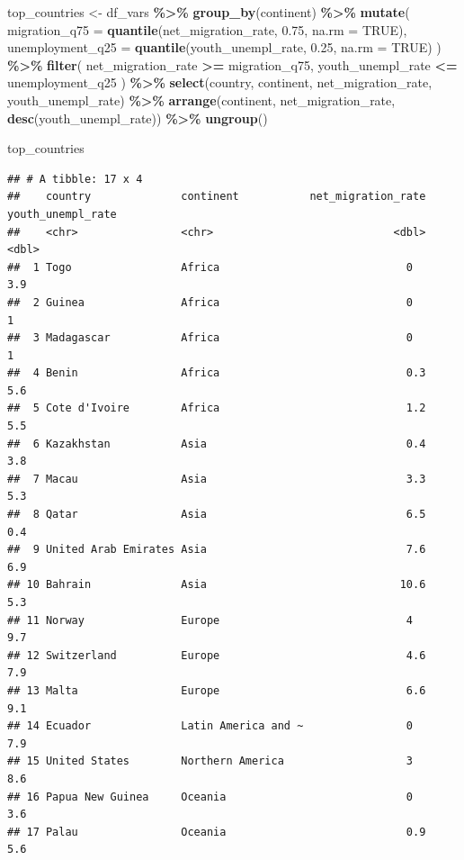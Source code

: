\documentclass[
]{article}
\newenvironment{Shaded}{\begin{snugshade}}{\end{snugshade}}
\newcommand{\AttributeTok}[1]{\textcolor[rgb]{0.13,0.29,0.53}{#1}}
\newcommand{\ConstantTok}[1]{\textcolor[rgb]{0.56,0.35,0.01}{#1}}
\newcommand{\FloatTok}[1]{\textcolor[rgb]{0.00,0.00,0.81}{#1}}
\newcommand{\FunctionTok}[1]{\textcolor[rgb]{0.13,0.29,0.53}{\textbf{#1}}}
\newcommand{\NormalTok}[1]{#1}
\newcommand{\OtherTok}[1]{\textcolor[rgb]{0.56,0.35,0.01}{#1}}
\newcommand{\SpecialCharTok}[1]{\textcolor[rgb]{0.81,0.36,0.00}{\textbf{#1}}}
\begin{document}
\begin{Shaded}
\begin{Highlighting}[]
\NormalTok{top\_countries }\OtherTok{\textless{}{-}}\NormalTok{ df\_vars }\SpecialCharTok{\%\textgreater{}\%}
  \FunctionTok{group\_by}\NormalTok{(continent) }\SpecialCharTok{\%\textgreater{}\%}
  \FunctionTok{mutate}\NormalTok{(}
    \AttributeTok{migration\_q75 =} \FunctionTok{quantile}\NormalTok{(net\_migration\_rate, }\FloatTok{0.75}\NormalTok{, }\AttributeTok{na.rm =} \ConstantTok{TRUE}\NormalTok{),}
    \AttributeTok{unemployment\_q25 =} \FunctionTok{quantile}\NormalTok{(youth\_unempl\_rate, }\FloatTok{0.25}\NormalTok{, }\AttributeTok{na.rm =} \ConstantTok{TRUE}\NormalTok{)}
\NormalTok{  ) }\SpecialCharTok{\%\textgreater{}\%}
  \FunctionTok{filter}\NormalTok{(}
\NormalTok{    net\_migration\_rate }\SpecialCharTok{\textgreater{}=}\NormalTok{ migration\_q75,}
\NormalTok{    youth\_unempl\_rate }\SpecialCharTok{\textless{}=}\NormalTok{ unemployment\_q25}
\NormalTok{  ) }\SpecialCharTok{\%\textgreater{}\%}
  \FunctionTok{select}\NormalTok{(country, continent, net\_migration\_rate, youth\_unempl\_rate) }\SpecialCharTok{\%\textgreater{}\%}
  \FunctionTok{arrange}\NormalTok{(continent, net\_migration\_rate, }\FunctionTok{desc}\NormalTok{(youth\_unempl\_rate)) }\SpecialCharTok{\%\textgreater{}\%}
  \FunctionTok{ungroup}\NormalTok{()}

\NormalTok{top\_countries}
\end{Highlighting}
\end{Shaded}

\begin{verbatim}
## # A tibble: 17 x 4
##    country              continent           net_migration_rate youth_unempl_rate
##    <chr>                <chr>                            <dbl>             <dbl>
##  1 Togo                 Africa                             0                 3.9
##  2 Guinea               Africa                             0                 1  
##  3 Madagascar           Africa                             0                 1  
##  4 Benin                Africa                             0.3               5.6
##  5 Cote d'Ivoire        Africa                             1.2               5.5
##  6 Kazakhstan           Asia                               0.4               3.8
##  7 Macau                Asia                               3.3               5.3
##  8 Qatar                Asia                               6.5               0.4
##  9 United Arab Emirates Asia                               7.6               6.9
## 10 Bahrain              Asia                              10.6               5.3
## 11 Norway               Europe                             4                 9.7
## 12 Switzerland          Europe                             4.6               7.9
## 13 Malta                Europe                             6.6               9.1
## 14 Ecuador              Latin America and ~                0                 7.9
## 15 United States        Northern America                   3                 8.6
## 16 Papua New Guinea     Oceania                            0                 3.6
## 17 Palau                Oceania                            0.9               5.6
\end{verbatim}
\end{document}
